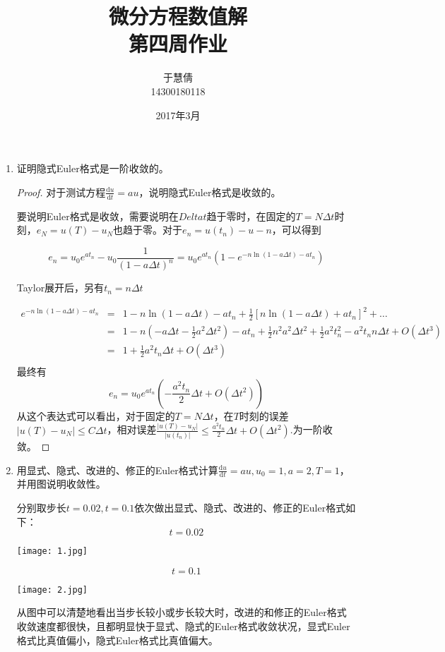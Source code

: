 \documentclass{ctexart}
\title{微分方程数值解 \\ 第四周作业}
\author{于慧倩 \\ 14300180118}
\date{2017年3月}
\begin{document}
\maketitle

\newpage

\begin{enumerate}

\item 证明隐式Euler格式是一阶收敛的。

\begin{proof}
对于测试方程\( \frac{\mathrm{d} u}{\mathrm{d} t}=au\)，说明隐式Euler格式是收敛的。

要说明Euler格式是收敛，需要说明在\(Delta t\)趋于零时，在固定的\(T=N \Delta t\)时刻，\(e_N=u(T)-u_N\)也趋于零。对于\(e_n=u(t_n)-u-n\)，可以得到

\[ e_n =u_0e^{at_n} - u_0 \frac{1}{(1-a \Delta t)^n}=u_0 e^{at_n}(1-e^{-n\ln(1-a \Delta t)-at_n})\]

Taylor展开后，另有\(t_n=n\Delta t\)

\begin{eqnarray*}
e^{-n\ln(1-a \Delta t)-at_n} &=& 1-n \ln(1-a\Delta t) - at_n+ \frac{1}{2} [n \ln(1-a \Delta t)+at_n]^2+\dots  \nonumber \\
&=&1-n(-a\Delta t-\frac{1}{2}a^2\Delta t^2)-at_n+\frac{1}{2}n^2a^2\Delta t^2+\frac{1}{2}a^2t_n^2-a^2t_nn\Delta t +O(\Delta t^3) \nonumber \\
&=&1+\frac{1}{2}a^2t_n\Delta t +O(\Delta t^3) \nonumber \\
\end{eqnarray*}
最终有
\[e_n=u_0e^{at_n}(-\frac{a^2t_n}{2}\Delta t+O(\Delta t^2)) \]
从这个表达式可以看出，对于固定的\(T=N \Delta t\)，在\(T\)时刻的误差\( | u(T)-u_N | \leq C\Delta t\)，相对误差\( \frac{| u(T)-u_N | }{|u(t_n)|} \leq \frac{a^2t_n}{2}\Delta t+O(\Delta t^2) \).为一阶收敛。
\end{proof}


\item 用显式、隐式、改进的、修正的Euler格式计算\(\frac{\mathrm{d}u}{\mathrm{d}t}=au,u_0=1,a=2,T=1\)，并用图说明收敛性。

分别取步长\(t=0.02,t=0.1\)依次做出显式、隐式、改进的、修正的Euler格式如下：
\newpage
\[t=0.02\]

\centerline{\texttt{[image: 1.jpg]}}

\[t=0.1\]

\centerline{\texttt{[image: 2.jpg]}}

从图中可以清楚地看出当步长较小或步长较大时，改进的和修正的Euler格式收敛速度都很快，且都明显快于显式、隐式的Euler格式收敛状况，显式Euler格式比真值偏小，隐式Euler格式比真值偏大。


\end{enumerate}
\end{document}
